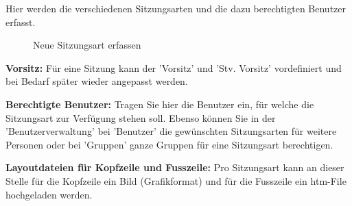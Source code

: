 Hier werden die verschiedenen Sitzungsarten und die dazu berechtigten Benutzer erfasst.

\begin{figure}[H]
\caption{Neue Sitzungsart erfassen}
\end{figure}

\textbf{Vorsitz:} Für eine Sitzung kann der 'Vorsitz' und 'Stv. Vorsitz' vordefiniert und bei Bedarf später wieder angepasst
werden.

\vspace{\baselineskip}

\textbf{Berechtigte Benutzer:} Tragen Sie hier die Benutzer ein, für welche die Sitzungsart zur Verfügung stehen soll. Ebenso können Sie in der 'Benutzerverwaltung' bei 'Benutzer' die gewünschten Sitzungsarten für weitere Personen oder bei 'Gruppen' ganze Gruppen für eine Sitzungsart berechtigen.

\vspace{\baselineskip}

\textbf{Layoutdateien für Kopfzeile und Fusszeile:} Pro Sitzungsart kann an dieser Stelle für die Kopfzeile ein Bild (Grafikformat) und für die Fusszeile ein htm-File hochgeladen werden.

\vspace{\baselineskip}

